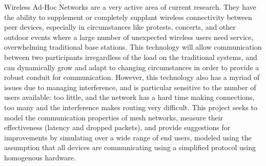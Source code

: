 Wireless Ad-Hoc Networks are a very active area of current research.
They have the ability to supplement or completely supplant wireless connectivity between peer devices,
especially in circumstances like protests, concerts, and other outdoor events where a large number of
unexpected wireless users need service, overwhelming traditional base stations.
This technology will allow communication between two participants irregardless of the load on the
traditional systems, and can dynamically grow and adapt to changing circumstances in order to provide
a robust conduit for communication.
However, this technology also has a myriad of issues due to managing interference, and is particular
sensitive to the number of users available: too little, and the network has a hard time making
connections, too many and the interference makes routing very difficult.
This project seeks to model the communication properties of mesh networks, 
measure their effectiveness (latency and dropped packets), 
and provide suggestions for improvements by simulating over a wide range of end users, 
modeled using the assumption that all devices are communicating using a simplified protocol
using homogenous hardware.

